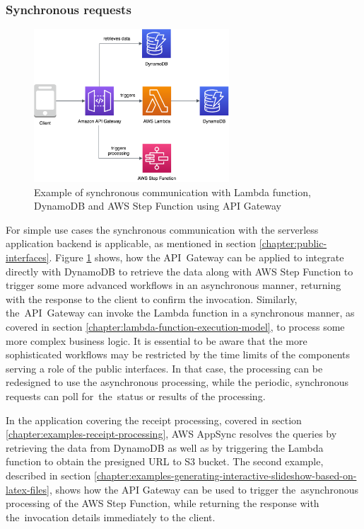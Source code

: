 \subsubsection{Synchronous requests} \label{chapter:client-synchronous-requests}

\begin{figure}[]
   \centering
   \includegraphics[width=0.65\textwidth]{assets/04-serverless-for-web-apps/synchronousRequest.png}
   \caption{Example of synchronous communication with Lambda function, DynamoDB and AWS Step Function using API Gateway}
   \label{fig:pattern-synchronous-request}
\end{figure}

For simple use cases the synchronous communication with the serverless application backend is applicable, as mentioned in section \ref{chapter:public-interfaces}.
Figure \ref{fig:pattern-synchronous-request} shows, how the API~Gateway can be applied to integrate directly with DynamoDB to retrieve the data along with AWS Step Function to trigger some more advanced workflows in an asynchronous manner, returning with the response to the client to confirm the invocation.
Similarly, the~API~Gateway can invoke the Lambda function in a synchronous manner, as covered in section \ref{chapter:lambda-function-execution-model}, to process some more complex business logic.
It is essential to be aware that the more sophisticated workflows may be restricted by the time limits of the components serving a role of the public interfaces.
In that case, the processing can be redesigned to use the asynchronous processing, while the periodic, synchronous requests can poll for~the~status or results of the processing.

In the application covering the receipt processing, covered in section \ref{chapter:examples-receipt-processing}, AWS AppSync resolves the queries by retrieving the data from DynamoDB as well as by triggering the Lambda function to obtain the presigned URL to S3 bucket.
The second example, described in section \ref{chapter:examples-generating-interactive-slideshow-based-on-latex-files}, shows how the API Gateway can be used to trigger the~asynchronous processing of the AWS Step Function, while returning the response with the~invocation details immediately to the client.

